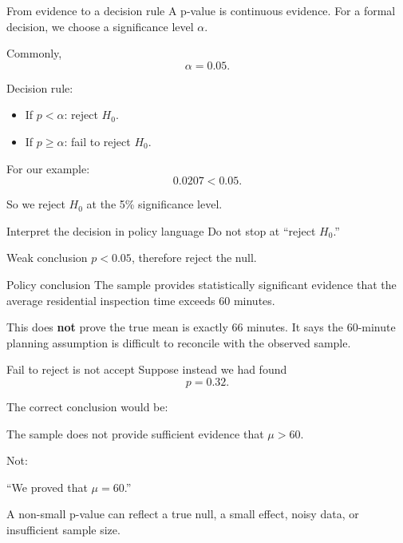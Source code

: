 \documentclass[11pt,aspectratio=169]{beamer}
\begin{document}
\begin{frame}{From evidence to a decision rule}
A p-value is continuous evidence. For a formal decision, we choose a significance level $\alpha$.

Commonly,
\[
\alpha=0.05.
\]

Decision rule:
\begin{itemize}
  \item If $p<\alpha$: \alert{reject $H_0$}.
  \item If $p\ge\alpha$: \alert{fail to reject $H_0$}.
\end{itemize}

For our example:
\[
0.0207<0.05.
\]

So we reject $H_0$ at the 5\% significance level.
\end{frame}

\begin{frame}{Interpret the decision in policy language}
Do not stop at ``reject $H_0$.''

\begin{block}{Weak conclusion}
$p<0.05$, therefore reject the null.
\end{block}

\begin{alertblock}{Policy conclusion}
The sample provides statistically significant evidence that the average residential inspection time exceeds 60 minutes.
\end{alertblock}

\vfill
This does \textbf{not} prove the true mean is exactly 66 minutes. It says the 60-minute planning assumption is difficult to reconcile with the observed sample.
\end{frame}

\begin{frame}{Fail to reject is not accept}
Suppose instead we had found
\[
p=0.32.
\]

The correct conclusion would be:

\begin{center}
\Large The sample does \alert{not provide sufficient evidence} that $\mu>60$.
\end{center}

Not:
\begin{center}
\Large ``We proved that $\mu=60$.''
\end{center}

\vfill
A non-small p-value can reflect a true null, a small effect, noisy data, or insufficient sample size.
\end{frame}
\end{document}
